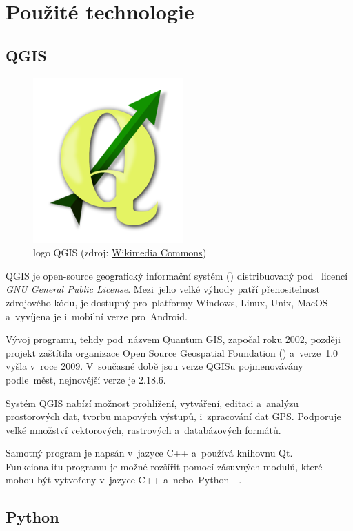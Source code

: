 \chapter{Použité technologie}
\label{3-technologie}

\section{QGIS}
\label{qgis}

	\begin{figure}[H]
		\centering
		\includegraphics[width=.25\textwidth]{./pictures/qgis_logo.png}
      	\caption[logo QGIS]{logo QGIS (zdroj: \href{https://commons.wikimedia.org/wiki/File:QGis_Logo.png}{Wikimedia Commons})}
		\label{fig:qgis_logo}
 	\end{figure}

QGIS je open-source geografický informační systém () distribuovaný pod ~licencí \textit{GNU General Public License}. Mezi~jeho velké výhody patří přenositelnost zdrojového kódu, je dostupný pro~platformy Windows, Linux, Unix, MacOS a~vyvíjena je i~mobilní verze pro~Android.

Vývoj programu, tehdy pod~názvem Quantum GIS, započal roku 2002, později projekt zaštítila organizace Open Source Geospatial Foundation () a~verze~1.0 vyšla v~roce 2009. V~současné době jsou verze QGISu pojmenovávány podle~měst, nejnovější verze je 2.18.6.

Systém QGIS nabízí možnost prohlížení, vytváření, editaci a~analýzu prostorových dat, tvorbu mapových výstupů, i~zpracování dat GPS. Podporuje velké množství vektorových, rastrových a~databázových formátů.

Samotný program je napsán v~jazyce C++ a~používá knihovnu Qt. Funkcionalitu programu je možné rozšířit pomocí zásuvných modulů, které mohou být vytvořeny v~jazyce C++ a~nebo~Python~\citep{qgis}~\citep{wiki_qgis}.

\section{Python}
\label{python}

